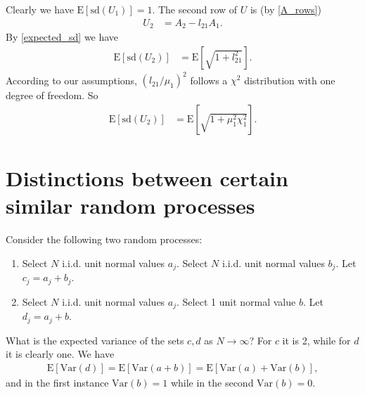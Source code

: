 \documentclass[12pt]{article}
\newcommand{\Var}{\mathrm{Var}}
\newcommand{\E}{\mathrm{E}}
\newcommand{\sd}{\mathrm{sd}}
\begin{document}
Clearly we have $\E[\sd(U_1)]=1$.  The second row of $U$ is (by \eqref{A_rows})
\begin{align}
U_2 & = A_2 - l_{21} A_1.
\end{align}
By \eqref{expected_sd} we have
\begin{align}
\E[\sd(U_2)] & = \E[\sqrt{1+l_{21}^2}].
\end{align}
According to our assumptions, $(l_{21}/\mu_1)^2$ follows a $\chi^2$
distribution with one degree of freedom.  So
\begin{align}
\E[\sd(U_2)] & = \E\left[\sqrt{1+\mu_1^2\chi_1^2}\right].
\end{align}


\section{Distinctions between certain similar random processes}
Consider the following two random processes:
\begin{enumerate}
    \item Select $N$ i.i.d. unit normal values $a_j$.  Select $N$ i.i.d.
            unit normal values $b_j$.  Let $c_j=a_j+b_j$.

    \item Select $N$ i.i.d. unit normal values $a_j$.  Select 1
            unit normal value $b$.  Let $d_j=a_j+b$.
\end{enumerate}
What is the expected variance of the sets $c,d$ as $N\to\infty$?
For $c$ it is 2, while for $d$ it is clearly one.  We have
\begin{align}
\E[\Var(d)] = \E[\Var(a+b)] = \E[\Var(a)+\Var(b)],
\end{align}
and in the first instance $\Var(b)=1$ while in the second $\Var(b)=0$.
\end{document}
